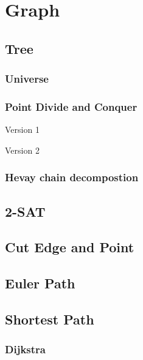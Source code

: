 \section{Graph}

\subsection{Tree}
\subsubsection{Universe}


\subsubsection{Point Divide and Conquer}

Version 1


Version 2


\subsubsection{Hevay chain decompostion}


\subsection{2-SAT}


\subsection{Cut Edge and Point}


\subsection{Euler Path}


\subsection{Shortest Path}
\subsubsection{Dijkstra}

